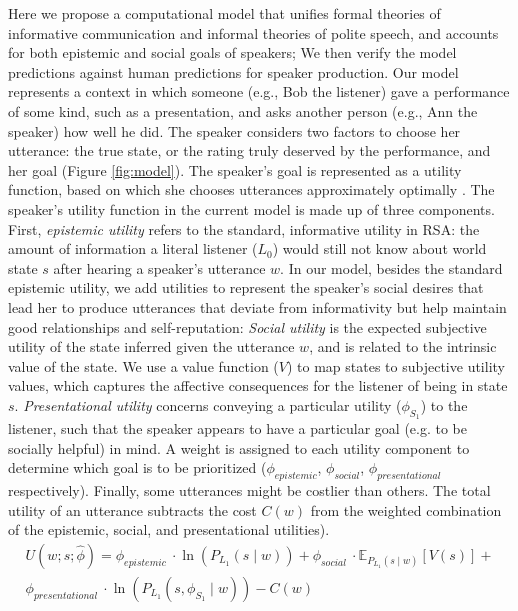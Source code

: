 \documentclass[12pt]{article}
\newcommand{\ejy}[1]{\textcolor{Red}{[ejy: #1]}}
\begin{document}
Here we propose a computational model 
that unifies formal theories of informative communication and informal theories of polite speech, 
and accounts for both epistemic and social goals of speakers; 
We then verify the model predictions against human predictions for speaker production.
Our model represents a context in which someone (e.g., Bob the listener) gave a performance of some kind, 
such as a presentation, and asks another person (e.g., Ann the speaker) how well he did. 
The speaker considers two factors to choose her utterance: 
the true state, or the rating truly deserved by the performance, 
and her goal (Figure \ref{fig:model}). 
The speaker's goal is represented as a utility function, 
based on which she chooses utterances approximately optimally \cite{goodman2013}. 
The speaker's utility function in the current model is made up of three components.
First, \emph{epistemic utility} refers to the standard, informative utility in RSA: 
the amount of information a literal listener (\(L_0\)) would still not know about world state \(s\) after hearing a speaker's utterance \(w\).
In our model, besides the standard epistemic utility, 
we add utilities to represent the speaker's social desires that lead her to produce utterances that deviate from informativity 
but help maintain good relationships and self-reputation:
\emph{Social utility} is the expected subjective utility of the state inferred given the utterance \(w\), 
and is related to the intrinsic value of the state.
We use a value function (\(V\)) to map states to subjective utility values,
which captures the affective consequences for the listener of being in state \(s\). 
\emph{Presentational utility} concerns conveying a particular utility (\(\phi_{S_1}\)) to the listener, 
such that the speaker appears to have a particular goal (e.g. to be socially helpful) in mind.
A weight is assigned to each utility component to determine which goal is to be prioritized (\(\phi_{epistemic}\), \(\phi_{social}\), \(\phi_{presentational}\) respectively). 
Finally, some utterances might be costlier than others. 
The total utility of an utterance subtracts the cost $C(w)$ from the weighted combination of the epistemic, social, and presentational utilities). 
\begin{multline}
U(w;s; \hat{\phi}) =  \phi_{epistemic}\ \cdot \ln(P_{L_1}(s \mid w))  +
\phi_{social}\ \cdot \mathbb{E}_{P_{L_1}(s \mid w)}[V(s)] + \\
\phi_{presentational}\ \cdot \ln(P_{L_1}(s,  \phi_{S_1} \mid w)) -
C(w)
\end{multline}
\end{document}
